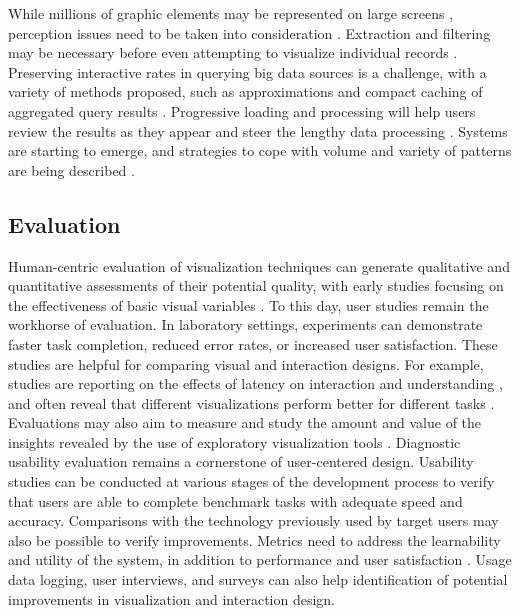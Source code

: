 \documentclass[]{krantz}
\begin{document}
While millions of graphic elements may be represented on large screens
\citep{fekete2002interactive}, perception issues need to be taken into
consideration \citep{yost2007beyond}. Extraction and filtering may be
necessary before even attempting to visualize individual records
\citep{wongsuphasawat2014using}. Preserving interactive rates in
querying big data sources is a challenge, with a variety of methods
proposed, such as approximations \citep{fisher2012trust} and compact
caching of aggregated query results \citep{lins2013nanocubes}.
Progressive loading and processing will help users review the results as
they appear and steer the lengthy data processing
\citep{glueck2014dive, fekete2015progressivis}. Systems are starting to
emerge, and strategies to cope with volume and variety of patterns are
being described \citep{shneiderman2015sharpening}.

\subsection{Evaluation}\label{sec:viz-4.2}

Human-centric evaluation of visualization techniques can generate
qualitative and quantitative assessments of their potential quality,
with early studies focusing on the effectiveness of basic visual
variables \citep{mackinlay1986automating}. To this day, user studies
remain the workhorse of evaluation. In laboratory settings, experiments
can demonstrate faster task completion, reduced error rates, or
increased user satisfaction. These studies are helpful for comparing
visual and interaction designs. For example, studies are reporting on
the effects of latency on interaction and understanding
\citep{liu2014effects}, and often reveal that different visualizations
perform better for different tasks
\citep{saket2014node, plaisant2002spacetree}. Evaluations may also aim
to measure and study the amount and value of the insights revealed by
the use of exploratory visualization tools \citep{saraiya2005insight}.
Diagnostic usability evaluation remains a cornerstone of user-centered
design. Usability studies can be conducted at various stages of the
development process to verify that users are able to complete benchmark
tasks with adequate speed and accuracy. Comparisons with the technology
previously used by target users may also be possible to verify
improvements. Metrics need to address the learnability and utility of
the system, in addition to performance and user satisfaction
\citep{lam2012empirical}. Usage data logging, user interviews, and
surveys can also help identification of potential improvements in
visualization and interaction design.
\end{document}
